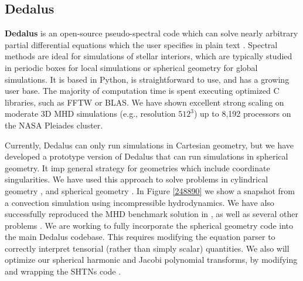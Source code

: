 \subsection{Dedalus}

\textbf{Dedalus} is an open-source pseudo-spectral code which can solve nearly arbitrary partial differential equations which the user specifies in plain text \citep[][source code at: dedalus-project.org]{Burns2016}. Spectral methods are ideal for simulations of stellar interiors, which are typically studied in periodic boxes for local simulations or spherical geometry for global simulations. It is based in Python, is straightforward to use, and has a growing user base. The majority of computation time is spent executing optimized C libraries, such as FFTW or BLAS. We have shown excellent strong scaling on moderate 3D MHD simulations (e.g., resolution $512^3$) up to 8,192 processors on the NASA Pleiades cluster.

Currently, Dedalus can only run simulations in Cartesian geometry, but we have developed a prototype version of Dedalus that can run simulations in spherical geometry. It imp general strategy for geometries which include coordinate singularities. We have used this approach to solve problems in cylindrical geometry \cite{Vasil_2016}, and spherical geometry \citep[][submitted to JCP]{p}. In Figure \ref{248890} we show a snapshot from a convection simulation using incompressible hydrodynamics. We have also successfully reproduced the MHD benchmark solution in \cite{Marti_2014}, as well as several other problems \citep[][submitted to JCP]{s}. We are working to fully incorporate the spherical geometry code into the main Dedalus codebase. This requires modifying the equation parser to correctly interpret tensorial (rather than simply scalar) quantities. We also will optimize our spherical harmonic and Jacobi polynomial transforms, by modifying and wrapping the SHTNs code \cite{Schaeffer_2013}.
